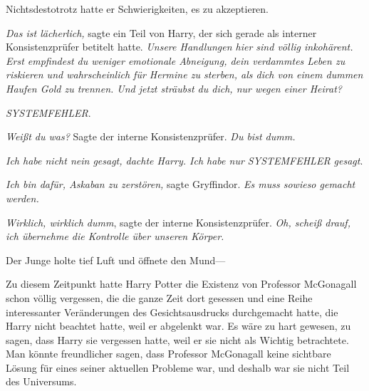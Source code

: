 Nichtsdestotrotz hatte er Schwierigkeiten, es zu akzeptieren.

\emph{Das ist lächerlich,} sagte ein Teil von Harry, der sich gerade als interner Konsistenzprüfer betitelt hatte. \emph{Unsere Handlungen hier sind völlig inkohärent. Erst empfindest du weniger emotionale Abneigung, dein verdammtes \emph{Leben} zu riskieren und wahrscheinlich für Hermine zu \emph{sterben}, als dich von einem dummen Haufen Gold zu trennen. Und jetzt sträubst du dich, nur wegen einer Heirat?}

\emph{SYSTEMFEHLER}.

\emph{Weißt du was?} Sagte der interne Konsistenzprüfer. \emph{Du bist dumm.}

\emph{Ich habe nicht nein gesagt, dachte Harry. Ich habe nur \emph{SYSTEMFEHLER} gesagt}.

\emph{Ich bin dafür, Askaban zu zerstören,} sagte Gryffindor. \emph{Es muss sowieso gemacht werden.}

\emph{Wirklich, wirklich dumm}, sagte der interne Konsistenzprüfer. \emph{Oh, scheiß drauf, ich übernehme die Kontrolle über unseren Körper.}

Der Junge holte tief Luft und öffnete den Mund—

Zu diesem Zeitpunkt hatte Harry Potter die Existenz von Professor McGonagall schon völlig vergessen, die die ganze Zeit dort gesessen und eine Reihe interessanter Veränderungen des Gesichtsausdrucks durchgemacht hatte, die Harry nicht beachtet hatte, weil er abgelenkt war. Es wäre zu hart gewesen, zu sagen, dass Harry sie vergessen hatte, weil er sie nicht als Wichtig betrachtete. Man könnte freundlicher sagen, dass Professor McGonagall keine sichtbare Lösung für eines seiner aktuellen Probleme war, und deshalb war sie nicht Teil des Universums.

